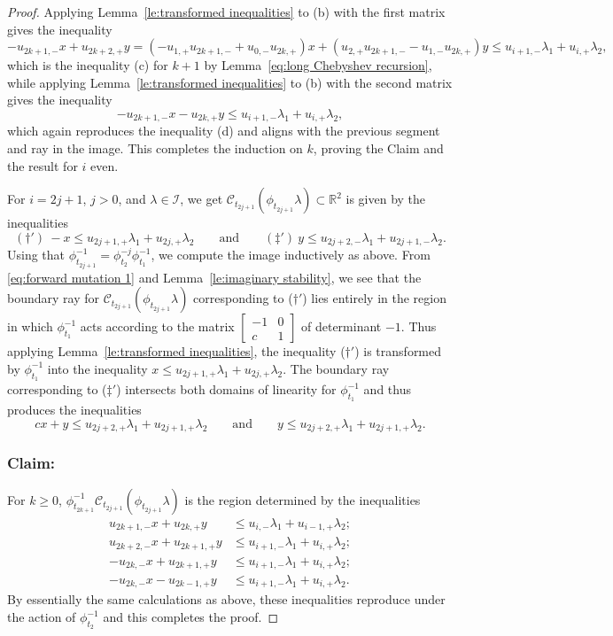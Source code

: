 \documentclass{amsart}
\numberwithin{theorem}{section}
\newcommand{\cC}{\mathcal{C}}
\newcommand{\cI}{\mathcal{I}}
\newcommand{\RR}{\mathbb{R}}
\begin{document}
\begin{proof}
    Applying Lemma~\ref{le:transformed inequalities} to (b) with the first matrix gives the inequality 
    \[-u_{2k+1,-}x+u_{2k+2,+}y=(-u_{1,+}u_{2k+1,-}+u_{0,-}u_{2k,+})x+(u_{2,+}u_{2k+1,-}-u_{1,-}u_{2k,+})y\le u_{i+1,-}\lambda_1+u_{i,+}\lambda_2,\]
    which is the inequality (c) for $k+1$ by Lemma~\ref{eq:long Chebyshev recursion}, while applying Lemma~\ref{le:transformed inequalities} to (b) with the second matrix gives the inequality 
    \[-u_{2k+1,-}x-u_{2k,+}y\le u_{i+1,-}\lambda_1+u_{i,+}\lambda_2,\]
    which again reproduces the inequality (d) and aligns with the previous segment and ray in the image.
    This completes the induction on $k$, proving the Claim and the result for $i$ even.


    For $i=2j+1$, $j>0$, and $\lambda\in\cI$, we get $\cC_{t_{2j+1}}(\phi_{t_{2j+1}}\lambda)\subset\RR^2$ is given by the inequalities 
    \[ (\dagger')\ -x\le u_{2j+1,+}\lambda_1+u_{2j,+}\lambda_2 \qquad\text{and}\qquad (\ddagger')\ y\le u_{2j+2,-}\lambda_1+u_{2j+1,-}\lambda_2.\]
    Using that $\phi_{t_{2j+1}}^{-1}=\phi_{t_2}^{-j}\phi_{t_1}^{-1}$, we compute the image inductively as above.
    From \eqref{eq:forward mutation 1} and Lemma~\ref{le:imaginary stability}, we see that the boundary ray for $\cC_{t_{2j+1}}(\phi_{t_{2j+1}}\lambda)$ corresponding to ($\dagger'$) lies entirely in the region in which $\phi_{t_1}^{-1}$ acts according to the matrix $\left[ \begin{array}{cc} -1 & 0\\ c & 1 \end{array}\right]$ of determinant $-1$.
    Thus applying Lemma~\ref{le:transformed inequalities}, the inequality ($\dagger'$) is transformed by $\phi_{t_1}^{-1}$ into the inequality $x\le u_{2j+1,+}\lambda_1+u_{2j,+}\lambda_2$.
    The boundary ray corresponding to ($\ddagger'$) intersects both domains of linearity for $\phi_{t_1}^{-1}$ and thus produces the inequalities
    \[ cx+y\le u_{2j+2,+}\lambda_1+u_{2j+1,+}\lambda_2 \qquad\text{and}\qquad  y\le u_{2j+2,+}\lambda_1+u_{2j+1,+}\lambda_2.\]


    \subsubsection*{Claim:} For $k\ge 0$, $\phi_{t_{2k+1}}^{-1}\cC_{t_{2j+1}}(\phi_{t_{2j+1}}\lambda)$ is the region determined by the inequalities 
    \begin{align*}
      \tag{a$'$} u_{2k+1,-}x+u_{2k,+}y &\le u_{i,-}\lambda_1+u_{i-1,+}\lambda_2;\\
      \tag{b$'$} u_{2k+2,-}x+u_{2k+1,+}y &\le u_{i+1,-}\lambda_1+u_{i,+}\lambda_2;\\
      \tag{c$'$} -u_{2k,-}x+u_{2k+1,+}y &\le u_{i+1,-}\lambda_1+u_{i,+}\lambda_2;\\
      \tag{d$'$} -u_{2k,-}x-u_{2k-1,+}y &\le u_{i+1,-}\lambda_1+u_{i,+}\lambda_2.
    \end{align*}
    By essentially the same calculations as above, these inequalities reproduce under the action of $\phi_{t_2}^{-1}$ and this completes the proof.
  \end{proof}
\end{document}

